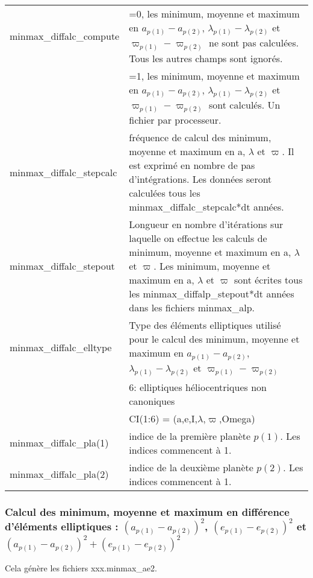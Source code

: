 \documentclass[11pt]{article}
\begin{document}
\begin{tabularx}{\textwidth}{|l|X|}
\hline
minmax\_diffalc\_compute  & =0, les minimum, moyenne et maximum en  $a_{p(1)}-a_{p(2)}$, $\lambda_{p(1)}-\lambda_{p(2)}$ et $\varpi_{p(1)}-\varpi_{p(2)}$ ne sont pas calcul\'ees. Tous les autres champs sont ignor\'es.\\
&=1, les minimum, moyenne et maximum en  $a_{p(1)}-a_{p(2)}$, $\lambda_{p(1)}-\lambda_{p(2)}$ et $\varpi_{p(1)}-\varpi_{p(2)}$ sont calcul\'es. Un fichier par processeur.\\ \hline
minmax\_diffalc\_stepcalc   & fr\'equence de calcul des minimum, moyenne et maximum en a, $\lambda$ et $\varpi$. Il est exprim\'e en nombre de pas d'int\'egrations. Les donn\'ees seront calcul\'ees tous les minmax\_diffalc\_stepcalc*dt ann\'ees.\\ \hline

minmax\_diffalc\_stepout   &Longueur en nombre d'it\'erations sur laquelle on effectue les calculs de minimum, moyenne et maximum en a, $\lambda$ et $\varpi$. Les minimum, moyenne et maximum en a, $\lambda$ et $\varpi$ sont \'ecrites tous les minmax\_diffalp\_stepout*dt ann\'ees dans les fichiers minmax\_alp. \\ \hline
minmax\_diffalc\_elltype  & Type des \'el\'ements elliptiques utilis\'e pour le calcul des  minimum, moyenne et maximum en $a_{p(1)}-a_{p(2)}$, $\lambda_{p(1)}-\lambda_{p(2)}$ et $\varpi_{p(1)}-\varpi_{p(2)}$ \\
&6:  elliptiques h\'eliocentriques non canoniques\\
&	     CI(1:6) = (a,e,I,$\lambda$,$\varpi$,Omega)\\ \hline
minmax\_diffalc\_pla(1)   & indice de la premi\`ere plan\`ete $p(1)$. Les indices commencent \`a 1.\\ \hline
minmax\_diffalc\_pla(2)   & indice de la deuxi\`eme plan\`ete $p(2)$. Les indices commencent \`a  1.\\ \hline
 \end{tabularx}

\vspace{0.5cm}
\subsubsection*{Calcul des minimum, moyenne et maximum en diff\'erence d'\'el\'ements elliptiques : $(a_{p(1)}-a_{p(2)})^2$, $(e_{p(1)}-e_{p(2)})^2$ et $(a_{p(1)}-a_{p(2)})^2+(e_{p(1)}-e_{p(2)})^2$}
Cela g\'en\`ere les fichiers xxx.minmax\_ae2.
\end{document}
